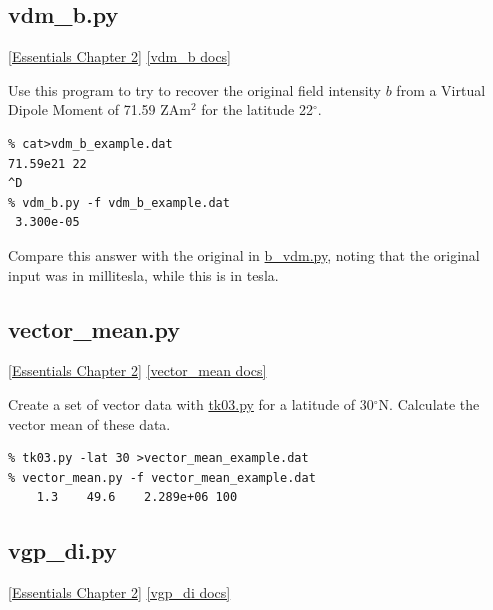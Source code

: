 \documentclass[11pt]{book}
\begin{document}
{{%



%
\subsection{vdm\_b.py}
\href{http://magician.ucsd.edu/Essentials_2/WebBook2ch2.html#ch2}{[Essentials Chapter 2]}
\href{http://earthref.org/PmagPy/pmagpydocs/vdm_b-module.html}{[vdm\_b docs]}


Use this program to try to recover the original field intensity $b$ from a Virtual Dipole Moment of  71.59 ZAm$^2$ for the latitude 22$^{\circ}$.  

\begin{verbatim}
% cat>vdm_b_example.dat
71.59e21 22
^D
% vdm_b.py -f vdm_b_example.dat 
 3.300e-05
\end{verbatim}

Compare this answer with the original in \href{#b_vdm.py}{b\_vdm.py}, noting that the original input was in millitesla, while this is in tesla.  



\subsection{vector\_mean.py}
\href{http://magician.ucsd.edu/Essentials_2/WebBook2ch2.html#ch2}{[Essentials Chapter 2]}
\href{http://earthref.org/PmagPy/pmagpydocs/vector_mean-module.html}{[vector\_mean docs]}

Create a set of vector data with \href{#tk03.py}{tk03.py} for a latitude of 30$^{\circ}$N.  Calculate the vector mean of these data.

\begin{verbatim}
% tk03.py -lat 30 >vector_mean_example.dat
% vector_mean.py -f vector_mean_example.dat 
    1.3    49.6    2.289e+06 100
\end{verbatim}

\subsection{vgp\_di.py}
\href{http://magician.ucsd.edu/Essentials_2/WebBook2ch2.html#ch2}{[Essentials Chapter 2]}
\href{http://earthref.org/PmagPy/pmagpydocs/vgp_di-module.html}{[vgp\_di docs]}

}}
\end{document}
